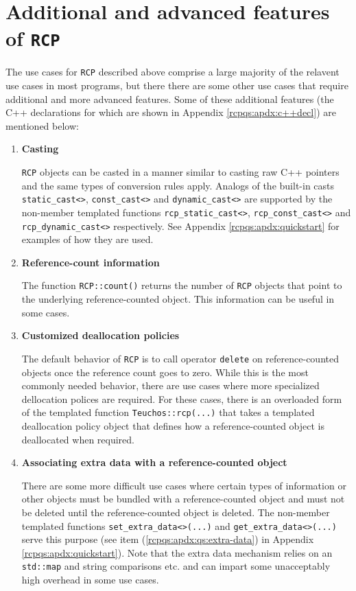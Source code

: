 \documentclass[pdf,ps2pdf,11pt]{SANDreport}
\begin{document}
%
\section{Additional and advanced features of {}\texttt{RCP}}
%

The use cases for {}\texttt{RCP} described above
comprise a large majority of the relavent use cases in most programs,
but there there are some other use cases that require additional and
more advanced features.  Some of these additional features (the C++
declarations for which are shown in Appendix
{}\ref{rcpqs:apdx:c++decl}) are mentioned below:

\begin{enumerate}

\item \textbf{Casting}

{}\texttt{RCP} objects can be casted in a manner similar
to casting raw C++ pointers and the same types of conversion rules
apply.  Analogs of the built-in casts {}\texttt{static\_\-cast<>},
{}\texttt{const\_\-cast<>} and {}\texttt{dynamic\_\-cast<>} are
supported by the non-member templated functions
{}\texttt{rcp\_\-static\_\-cast<>}, {}\texttt{rcp\_\-const\_\-cast<>}
and {}\texttt{rcp\_\-dynamic\_\-cast<>} respectively.  See Appendix
{}\ref{rcpqs:apdx:quickstart} for examples of how they are used.

\item \textbf{Reference-count information}

The function {}\texttt{RCP\-::count()} returns the
number of {}\texttt{RCP} objects that point to the
underlying reference-counted object.  This information can be useful
in some cases.

\item \textbf{Customized deallocation policies}

The default behavior of {}\texttt{RCP} is to call
operator {}\texttt{delete} on reference-counted objects once the
reference count goes to zero.  While this is the most commonly needed
behavior, there are use cases where more specialized dellocation
polices are required.  For these cases, there is an overloaded form of
the templated function {}\texttt{Teuchos\-::rcp(...)} that takes a
templated deallocation policy object that defines how a
reference-counted object is deallocated when required.

\item \textbf{Associating extra data with a reference-counted object}

There are some more difficult use cases where certain types of information or
other objects must be bundled with a reference-counted object and must not be
deleted until the reference-counted object is deleted.  The non-member
templated functions {}\texttt{set\-\_extra\-\_data<>(...)} and
{}\texttt{get\-\_extra\-\_data<>(...)} serve this purpose (see item
({}\ref{rcpqs:apdx:qs:extra-data}) in Appendix {}\ref{rcpqs:apdx:quickstart}).
Note that the extra data mechanism relies on an {}\texttt{std::map} and string
comparisons etc. and can impart some unacceptably high overhead in some use
cases.


\end{enumerate}
\end{document}
